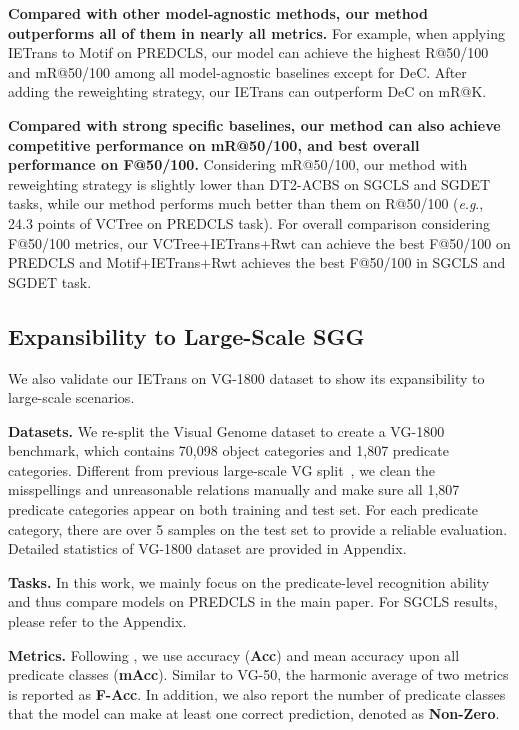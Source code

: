 \documentclass[runningheads]{llncs}
\newcommand{\eg}{\textit{e}.\textit{g}.}
\begin{document}
\textbf{Compared with other model-agnostic methods, our method outperforms all of them in nearly all metrics.}
For example, when applying IETrans to Motif on PREDCLS, our model can achieve the highest R@50/100 and mR@50/100 among all model-agnostic baselines except for DeC.
After adding the reweighting strategy, our IETrans can outperform DeC on mR@K.

\textbf{Compared with strong specific baselines, our method can also achieve competitive performance on mR@50/100, and best overall performance on F@50/100.}
Considering mR@50/100, our method with reweighting strategy is slightly lower than DT2-ACBS on SGCLS and SGDET tasks, while our method performs much better than them on R@50/100 (\eg, 24.3 points of VCTree on PREDCLS task).
For overall comparison considering F@50/100 metrics, our VCTree+IETrans+Rwt can achieve the best F@50/100 on PREDCLS and Motif+IETrans+Rwt achieves the best F@50/100 in SGCLS and SGDET task.


\subsection{Expansibility to Large-Scale SGG}
We also validate our IETrans on VG-1800 dataset to show its expansibility to large-scale scenarios.

\smallskip
\noindent
\textbf{Datasets.} We re-split the Visual Genome dataset to create a VG-1800 benchmark, which contains 70,098 object categories and 1,807 predicate categories.
Different from previous large-scale VG split~\cite{zhang2019large,abdelkarim2020long}, we clean the misspellings and unreasonable relations manually and make sure all 1,807 predicate categories appear on both training and test set. For each predicate category, there are over 5 samples on the test set to provide a reliable evaluation.
Detailed statistics of VG-1800 dataset are provided in Appendix.

\smallskip
\noindent
\textbf{Tasks.}
In this work, we mainly focus on the predicate-level recognition ability and thus compare models on PREDCLS in the main paper.
For SGCLS results, please refer to the Appendix.

\smallskip
\noindent
\textbf{Metrics.}
Following \cite{zhang2019large,abdelkarim2020long}, we use accuracy (\textbf{Acc}) and mean accuracy upon all predicate classes (\textbf{mAcc}).
Similar to VG-50, the harmonic average of two metrics is reported as \textbf{F-Acc}.
In addition, we also report the number of predicate classes that the model can make at least one correct prediction, denoted as \textbf{Non-Zero}.
\end{document}
